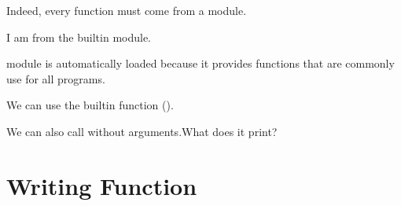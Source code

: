 \documentclass[letterpaper,10pt,english]{sphinxmanual}
\begin{document}
\begin{sphinxVerbatim}[commandchars=\\\{\}]
\end{sphinxVerbatim}


Indeed, every function must come from a module.

\begin{sphinxVerbatim}[commandchars=\\\{\}]
\end{sphinxVerbatim}

\begin{sphinxVerbatim}[commandchars=\\\{\}]
I am from the \PYGZus{}\PYGZus{}builtin\PYGZus{}\PYGZus{} module.
\end{sphinxVerbatim}

 module is automatically loaded because it provides functions that are commonly use for all programs.


We can use the built\sphinxhyphen{}in function  ().

\begin{sphinxVerbatim}[commandchars=\\\{\}]
\end{sphinxVerbatim}

We can also call  without arguments.What does it print?

\begin{sphinxVerbatim}[commandchars=\\\{\}]
\end{sphinxVerbatim}


\chapter{Writing Function}
\label{\detokenize{Lecture4/Writing Functions:writing-function}}\label{\detokenize{Lecture4/Writing Functions::doc}}
\end{document}

